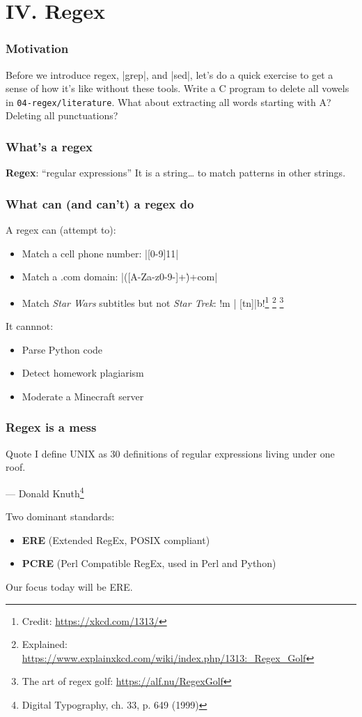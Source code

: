 
\section{IV. Regex}
\begin{frame}[fragile]
\frametitle{Motivation}
Before we introduce regex, \cverb|grep|, and \cverb|sed|, let's do a quick
exercise to get a sense of how it's like without these tools.
\newline \newline
Write a C program to delete all vowels in \texttt{04-regex/literature}.
What about extracting all words starting with A? Deleting all punctuations?
\end{frame}

\begin{frame}[fragile]
\frametitle{What's a regex}
\textbf{Regex}: ``regular expressions''
\newline \newline
It is a string… to match patterns in other strings.
\end{frame}

\begin{frame}[fragile]
\frametitle{What can (and can't) a regex do}
A regex can (attempt to):
\begin{itemize}
    \item Match a cell phone number: \cverb|[0-9]{11}|
    \item Match a .com domain: \cverb|([A-Za-z0-9-]+\.)+com|
    \item Match \textit{Star Wars} subtitles but not \textit{Star Trek}:
        \cverb!m | [tn]|b!\footnote{Credit: \url{https://xkcd.com/1313/}}
	\footnote{Explained: \url{https://www.explainxkcd.com/wiki/index.php/1313:_Regex_Golf}}
        \footnote{The art of regex golf: \url{https://alf.nu/RegexGolf}}
\end{itemize}
It cannnot:
\begin{itemize}
    \item Parse Python code
    \item Detect homework plagiarism
    \item Moderate a Minecraft server
\end{itemize}
\end{frame}

\begin{frame}
\frametitle{Regex is a mess}
\begin{block}{Quote}
I define UNIX as 30 definitions of regular expressions living under one roof.
\begin{flushright}
    — Donald Knuth\footnote{Digital Typography, ch. 33, p. 649 (1999)}
\end{flushright}
\end{block}

Two dominant standards:
\begin{itemize}
    \item \textbf{ERE} (Extended RegEx, POSIX compliant)
    \item \textbf{PCRE} (Perl Compatible RegEx, used in Perl and Python)
\end{itemize}
Our focus today will be ERE.
\end{frame}

